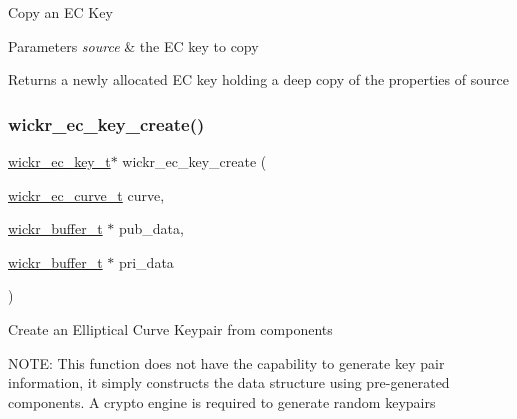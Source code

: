 Copy an EC Key


\begin{DoxyParams}{Parameters}
{\em source} & the EC key to copy \\
\hline
\end{DoxyParams}
\begin{DoxyReturn}{Returns}
a newly allocated EC key holding a deep copy of the properties of \textquotesingle{}source\textquotesingle{} 
\end{DoxyReturn}
\mbox{\label{group__wickr__ec__curve_ga912f46bc12a39f57d8d1b87a639f7cdf}} 
\subsubsection{\texorpdfstring{wickr\+\_\+ec\+\_\+key\+\_\+create()}{wickr\_ec\_key\_create()}}
{\footnotesize\ttfamily \hyperlink{structwickr__ec__key}{wickr\+\_\+ec\+\_\+key\+\_\+t}$\ast$ wickr\+\_\+ec\+\_\+key\+\_\+create (\begin{DoxyParamCaption}\item[{\hyperlink{structwickr__ec__curve}{wickr\+\_\+ec\+\_\+curve\+\_\+t}}]{curve,  }\item[{\hyperlink{structwickr__buffer}{wickr\+\_\+buffer\+\_\+t} $\ast$}]{pub\+\_\+data,  }\item[{\hyperlink{structwickr__buffer}{wickr\+\_\+buffer\+\_\+t} $\ast$}]{pri\+\_\+data }\end{DoxyParamCaption})}

Create an Elliptical Curve Keypair from components

N\+O\+TE\+: This function does not have the capability to generate key pair information, it simply constructs the data structure using pre-\/generated components. A crypto engine is required to generate random keypairs



